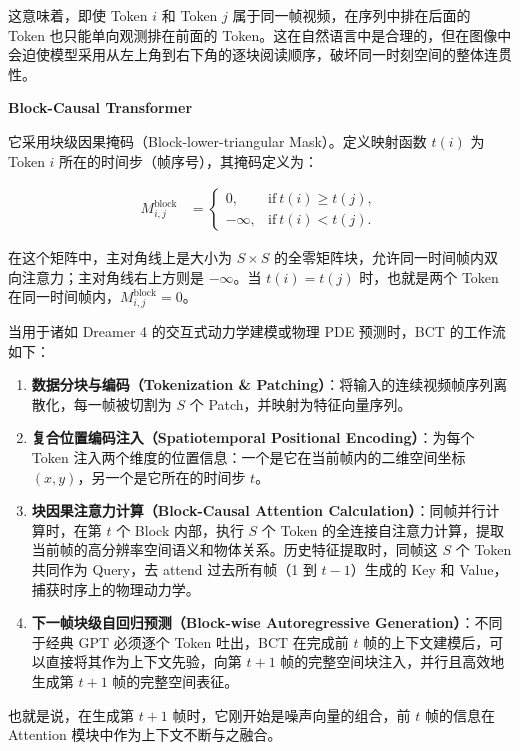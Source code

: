 这意味着，即使 Token \(i\) 和 Token \(j\) 属于同一帧视频，在序列中排在后面的 Token 也只能单向观测排在前面的 Token。这在自然语言中是合理的，但在图像中会迫使模型采用从左上角到右下角的逐块阅读顺序，破坏同一时刻空间的整体连贯性。

\textbf{Block-Causal Transformer}

它采用块级因果掩码（Block-lower-triangular Mask）。定义映射函数 \(t(i)\) 为 Token \(i\) 所在的时间步（帧序号），其掩码定义为：

\[
\begin{aligned}
M^{\mathrm{block}}_{i,j}
&=
\begin{cases}
0, & \mathrm{if}\ t(i) \ge t(j), \\
-\infty, & \mathrm{if}\ t(i) < t(j).
\end{cases}
\end{aligned}
\]

在这个矩阵中，主对角线上是大小为 \(S \times S\) 的全零矩阵块，允许同一时间帧内双向注意力；主对角线右上方则是 \(-\infty\)。当 \(t(i) = t(j)\) 时，也就是两个 Token 在同一时间帧内，\(M^{\mathrm{block}}_{i,j} = 0\)。

当用于诸如 Dreamer 4 的交互式动力学建模或物理 PDE 预测时，BCT 的工作流如下：

\begin{enumerate}
\def\labelenumi{\arabic{enumi}.}
\tightlist
\item
  \textbf{数据分块与编码（Tokenization \& Patching）}：将输入的连续视频帧序列离散化，每一帧被切割为 \(S\) 个 Patch，并映射为特征向量序列。
\item
  \textbf{复合位置编码注入（Spatiotemporal Positional Encoding）}：为每个 Token 注入两个维度的位置信息：一个是它在当前帧内的二维空间坐标 \((x, y)\)，另一个是它所在的时间步 \(t\)。
\item
  \textbf{块因果注意力计算（Block-Causal Attention Calculation）}：同帧并行计算时，在第 \(t\) 个 Block 内部，执行 \(S\) 个 Token 的全连接自注意力计算，提取当前帧的高分辨率空间语义和物体关系。历史特征提取时，同帧这 \(S\) 个 Token 共同作为 Query，去 attend 过去所有帧（1 到 \(t - 1\)）生成的 Key 和 Value，捕获时序上的物理动力学。
\item
  \textbf{下一帧块级自回归预测（Block-wise Autoregressive Generation）}：不同于经典 GPT 必须逐个 Token 吐出，BCT 在完成前 \(t\) 帧的上下文建模后，可以直接将其作为上下文先验，向第 \(t + 1\) 帧的完整空间块注入，并行且高效地生成第 \(t + 1\) 帧的完整空间表征。
\end{enumerate}

也就是说，在生成第 \(t+1\) 帧时，它刚开始是噪声向量的组合，前 \(t\) 帧的信息在 Attention 模块中作为上下文不断与之融合。

